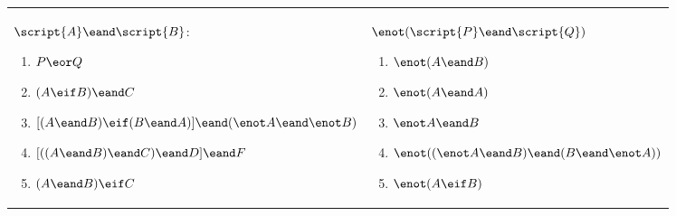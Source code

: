 \begin{exercises}
\begin{longtabu}{X[1,p,m]X[1,p,m]} 

\item $\script{A} \eand \script{B}$: 
	\begin{enumerate}[label=\alph*.]
	\item $P \eor Q$
	\item $(A \eif B) \eand C$
	\item \begin{flushleft}$[(A \eand B) \eif (B \eand A)] \linebreak \eand (\enot A \eand \enot B)$\end{flushleft}
	\item $[((A \eand B) \eand C) \eand D] \eand F$  
	\item $(A \eand B) \eif C$
	\end{enumerate}


&

\item $\enot(\script{P} \eand \script{Q})$
	\begin{enumerate}[label=\alph*.]
	\item $\enot(A \eand B)$
	\item $\enot(A \eand A)$
	\item $\enot A \eand B$
	\item \begin{flushleft}$\enot((\enot A \eand B) \eand (B \eand \enot A))$\end{flushleft}
	\item $\enot(A \eif B)$
	\end{enumerate}



\end{longtabu}
\end{exercises}
